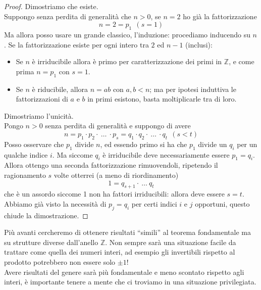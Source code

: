\begin{proof} Dimostriamo che esiste. \\ Suppongo senza perdita di generalità che $n>0$, se $n=2$ ho già la fattorizzazione
	\begin{equation*}
	n = 2 = p_1 \ \ (s=1)
	\end{equation*}
	Ma allora posso usare un grande classico, l'induzione: procediamo inducendo su $n$. Se la fattorizzazione esiste per ogni intero tra $2$ ed $n-1$ (inclusi):
	\begin{itemize}
		\item Se $n$ è irriducibile allora è primo per caratterizzazione dei primi in $\mathbb{Z}$, e come prima $n=p_1$ con $s=1$.
		\item Se $n$ è riducibile, allora $n=ab$ con $a,b<n$; ma per ipotesi induttiva le fattorizzazioni di $a$ e $b$ in primi esistono, basta moltiplicarle tra di loro.
	\end{itemize}
	Dimostriamo l'unicità. \\ Pongo $n>0$ senza perdita di generalità e suppongo di avere
	\begin{equation*}
	 n= p_1\cdot p_2 \cdot \ \dots\ \cdot p_s= q_1\cdot q_2 \cdot \ \dots\ \cdot q_t \ \ (s < t)
	\end{equation*}
	Posso osservare che $p_1$ divide $n$, ed essendo primo si ha che $p_1$ divide un $q_i$ per un qualche indice $i$. Ma siccome $q_i$ è irriducibile deve necessariamente essere $p_1=q_i$. Allora ottengo una seconda fattorizzazione rimuovendoli, ripetendo il ragionamento $s$ volte otterrei (a meno di riordinamento)
	\begin{equation*}
	1 = q_{s+1}\cdot \ \dots \ q_t
	\end{equation*}
	che è un assordo siccome 1 non ha fattori irriducibili: allora deve essere $s=t$. \\ Abbiamo già visto la necessità di $p_j = q_i$ per certi indici $i$ e $j$ opportuni, questo chiude la dimostrazione.
\end{proof}
Più avanti cercheremo di ottenere risultati \enquote{simili} al teorema fondamentale ma su strutture diverse dall'anello $\mathbb{Z}$. Non sempre sarà una situazione facile da trattare come quella dei numeri interi, ad esempio gli invertibili rispetto al prodotto potrebbero non essere solo $\pm 1$! \\ Avere risultati del genere sarà più fondamentale e meno scontato rispetto agli interi, è importante tenere a mente che ci troviamo in una situazione privilegiata.




